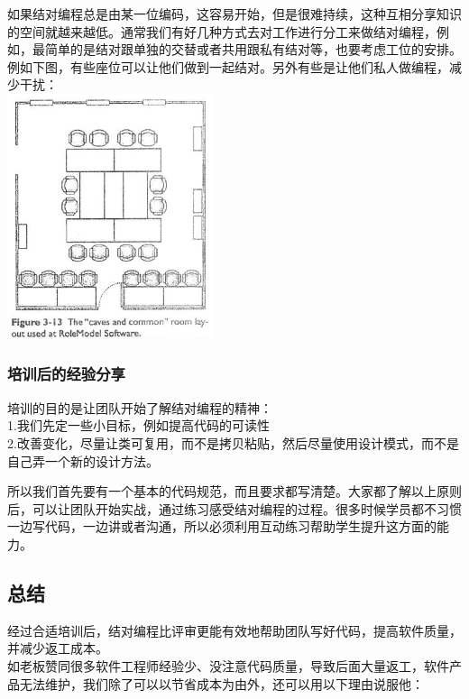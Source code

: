 如果结对编程总是由某一位编码，这容易开始，但是很难持续，这种互相分享知识的空间就越来越低。通常我们有好几种方式去对工作进行分工来做结对编程，例如，最简单的是结对跟单独的交替或者共用跟私有结对等，也要考虑工位的安排。例如下图，有些座位可以让他们做到一起结对。另外有些是让他们私人做编程，减少干扰：\\

\includegraphics[width=6cm]{acp3-13.jpg}

\hypertarget{ux57f9ux8badux540eux7684ux7ecfux9a8cux5206ux4eab}{%
\subsubsection{培训后的经验分享}\label{ux57f9ux8badux540eux7684ux7ecfux9a8cux5206ux4eab}}

培训的目的是让团队开始了解结对编程的精神：\\
1.我们先定一些小目标，例如提高代码的可读性\\
2.改善变化，尽量让类可复用，而不是拷贝粘贴，然后尽量使用设计模式，而不是自己弄一个新的设计方法。

所以我们首先要有一个基本的代码规范，而且要求都写清楚。大家都了解以上原则后，可以让团队开始实战，通过练习感受结对编程的过程。很多时候学员都不习惯一边写代码，一边讲或者沟通，所以必须利用互动练习帮助学生提升这方面的能力。

\hypertarget{ux603bux7ed3}{%
\subsection{总结}\label{ux603bux7ed3}}

经过合适培训后，结对编程比评审更能有效地帮助团队写好代码，提高软件质量，并减少返工成本。\\
如老板赞同很多软件工程师经验少、没注意代码质量，导致后面大量返工，软件产品无法维护，我们除了可以以节省成本为由外，还可以用以下理由说服他：

